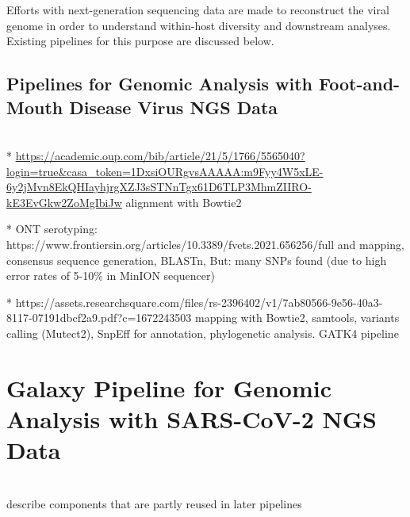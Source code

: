 Efforts with next-generation sequencing data are made to reconstruct the viral genome in order to understand within-host diversity and downstream analyses. Existing pipelines for this purpose are discussed below.

\subsection{Pipelines for Genomic Analysis with Foot-and-Mouth Disease Virus NGS Data}
\todoit \\
* \url{https://academic.oup.com/bib/article/21/5/1766/5565040?login=true&casa_token=1DxsiOURgvsAAAAA:m9Fyy4W5xLE-6y2jMvn8EkQHIayhjrgXZJ3sSTNnTgx61D6TLP3MhmZIIRO-kE3EvGkw2ZoMgIbiJw} alignment with Bowtie2

* \ac{ONT} serotyping: https://www.frontiersin.org/articles/10.3389/fvets.2021.656256/full and mapping, consensus sequence generation, BLASTn, But: many SNPs found (due to high error rates of 5-10\% in MinION sequencer)

* https://assets.researchsquare.com/files/rs-2396402/v1/7ab80566-9e56-40a3-8117-07191dbcf2a9.pdf?c=1672243503 mapping with Bowtie2, samtools, variants calling (Mutect2), SnpEff for annotation, phylogenetic analysis. GATK4 pipeline

\section{Galaxy Pipeline for Genomic Analysis with SARS-CoV-2 NGS Data}
\todoit \\
describe components that are partly reused in later pipelines

